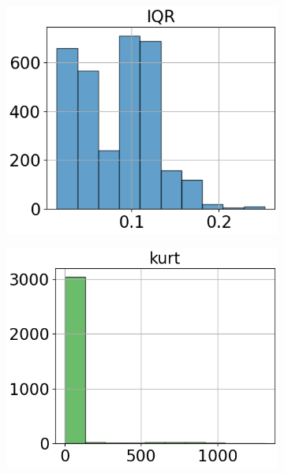 \begin{figure}[htbp]
\begin{subfigure}[t]{.24\textwidth}
    \end{subfigure}
    \begin{subfigure}[t]{.24\textwidth}
        \centering 
        \includegraphics[width=\linewidth]{../../python_code/plots/logistic_regression/histogram-IQR.png}
    \end{subfigure}
    \begin{subfigure}[t]{.24\textwidth}
        \centering 
        \includegraphics[width=\linewidth]{../../python_code/plots/logistic_regression/histogram-kurt.png}
    \end{subfigure}

\end{figure}

